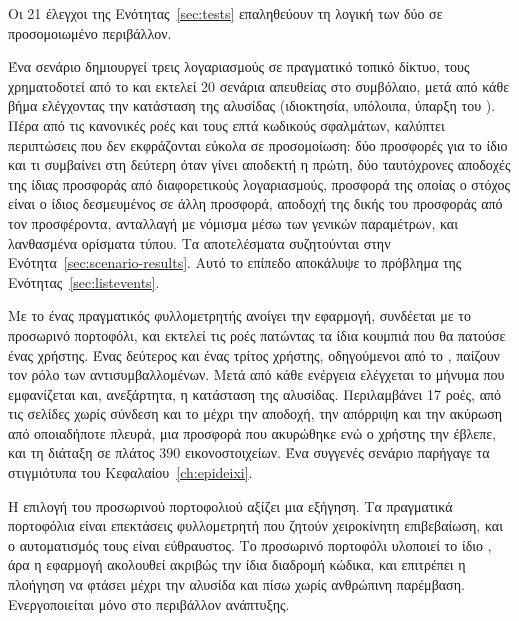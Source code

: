 \begin{description}[leftmargin=1.2em,itemsep=3pt]
  \item[Έλεγχοι μονάδας του συμβολαίου.] Οι 21 έλεγχοι της Ενότητας~\ref{sec:tests}
    επαληθεύουν τη λογική των δύο  σε προσομοιωμένο περιβάλλον.
  \item[Σενάρια συμβολαίου μέσω \en{SDK}.] Ένα σενάριο  δημιουργεί τρεις
    λογαριασμούς σε πραγματικό τοπικό δίκτυο, τους χρηματοδοτεί από το  και
    εκτελεί 20 σενάρια απευθείας στο συμβόλαιο, μετά από κάθε βήμα ελέγχοντας την
    κατάσταση της αλυσίδας (ιδιοκτησία, υπόλοιπα, ύπαρξη του ). Πέρα από τις
    κανονικές ροές και τους επτά κωδικούς σφαλμάτων, καλύπτει περιπτώσεις που δεν
    εκφράζονται εύκολα σε προσομοίωση: δύο προσφορές για το ίδιο  και τι συμβαίνει
    στη δεύτερη όταν γίνει αποδεκτή η πρώτη, δύο ταυτόχρονες αποδοχές της ίδιας προσφοράς
    από διαφορετικούς λογαριασμούς, προσφορά της οποίας ο στόχος είναι ο ίδιος δεσμευμένος
    σε άλλη προσφορά, αποδοχή της δικής του προσφοράς από τον προσφέροντα, ανταλλαγή
     με νόμισμα μέσω των γενικών παραμέτρων, και λανθασμένα ορίσματα τύπου. Τα
    αποτελέσματα συζητούνται στην Ενότητα~\ref{sec:scenario-results}. Αυτό το επίπεδο
    αποκάλυψε το πρόβλημα της Ενότητας~\ref{sec:listevents}.
  \item[Αυτοματοποιημένη πλοήγηση της διεπαφής.] Με το  \cite{playwright}
    ένας πραγματικός φυλλομετρητής ανοίγει την εφαρμογή, συνδέεται με το προσωρινό
    πορτοφόλι, και εκτελεί τις ροές πατώντας τα ίδια κουμπιά που θα πατούσε ένας χρήστης.
    Ένας δεύτερος και ένας τρίτος χρήστης, οδηγούμενοι από το , παίζουν τον ρόλο
    των αντισυμβαλλομένων. Μετά από κάθε ενέργεια ελέγχεται το μήνυμα που εμφανίζεται και,
    ανεξάρτητα, η κατάσταση της αλυσίδας. Περιλαμβάνει 17 ροές, από τις σελίδες χωρίς
    σύνδεση και το  μέχρι την αποδοχή, την απόρριψη και την ακύρωση από
    οποιαδήποτε πλευρά, μια προσφορά που ακυρώθηκε ενώ ο χρήστης την έβλεπε, και τη
    διάταξη σε πλάτος 390 εικονοστοιχείων. Ένα συγγενές σενάριο παρήγαγε τα στιγμιότυπα
    του Κεφαλαίου~\ref{ch:epideixi}.
\end{description}

Η επιλογή του προσωρινού πορτοφολιού αξίζει μια εξήγηση. Τα πραγματικά πορτοφόλια είναι
επεκτάσεις φυλλομετρητή που ζητούν χειροκίνητη επιβεβαίωση, και ο αυτοματισμός τους είναι
εύθραυστος. Το προσωρινό πορτοφόλι υλοποιεί το ίδιο , άρα η εφαρμογή
ακολουθεί ακριβώς την ίδια διαδρομή κώδικα, και επιτρέπει η πλοήγηση να φτάσει μέχρι την
αλυσίδα και πίσω χωρίς ανθρώπινη παρέμβαση. Ενεργοποιείται μόνο στο περιβάλλον ανάπτυξης.

